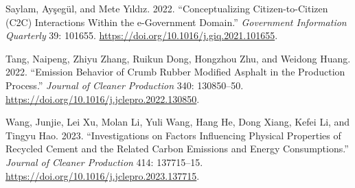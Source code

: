 \documentclass[
  12pt,
]{article}
\newlength{\cslhangindent}
\newenvironment{CSLReferences}[2] %
 {\begin{list}{}{%
  \setlength{\itemindent}{0pt}
  \setlength{\leftmargin}{0pt}
  \setlength{\parsep}{0pt}
  \ifodd #1
   \setlength{\leftmargin}{\cslhangindent}
   \setlength{\itemindent}{-1\cslhangindent}
  \fi
  \setlength{\itemsep}{#2\baselineskip}}}
 {\end{list}}
\begin{document}
\begin{CSLReferences}{1}{0}
Saylam, Ayşegül, and Mete Yıldız. 2022. {``Conceptualizing
Citizen-to-Citizen (C2C) Interactions Within the e-Government Domain.''}
\emph{Government Information Quarterly} 39: 101655.
\url{https://doi.org/10.1016/j.giq.2021.101655}.

Tang, Naipeng, Zhiyu Zhang, Ruikun Dong, Hongzhou Zhu, and Weidong
Huang. 2022. {``Emission Behavior of Crumb Rubber Modified Asphalt in
the Production Process.''} \emph{Journal of Cleaner Production} 340:
130850--50. \url{https://doi.org/10.1016/j.jclepro.2022.130850}.

Wang, Junjie, Lei Xu, Molan Li, Yuli Wang, Hang He, Dong Xiang, Kefei
Li, and Tingyu Hao. 2023. {``Investigations on Factors Influencing
Physical Properties of Recycled Cement and the Related Carbon Emissions
and Energy Consumptions.''} \emph{Journal of Cleaner Production} 414:
137715--15. \url{https://doi.org/10.1016/j.jclepro.2023.137715}.

\end{CSLReferences}
\end{document}
